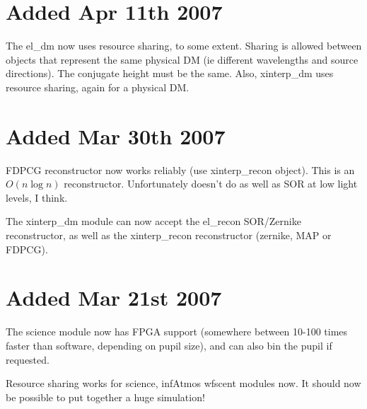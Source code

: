 \documentclass{article}
\begin{document}
\section{Added Apr 11th 2007}
The el\_dm now uses resource sharing, to some extent.  Sharing is
allowed between objects that represent the same physical DM (ie
different wavelengths and source directions).  The conjugate height
must be the same.  Also, xinterp\_dm uses resource sharing, again for
a physical DM.

\section{Added Mar 30th 2007}
FDPCG reconstructor now works reliably (use xinterp\_recon object).
This is an $O(n\log n)$ reconstructor.  Unfortunately doesn't do as
well as SOR at low light levels, I think.

The xinterp\_dm module can now accept the el\_recon SOR/Zernike
reconstructor, as well as the xinterp\_recon reconstructor (zernike,
MAP or FDPCG).

\section{Added Mar 21st 2007}
The science module now has FPGA support (somewhere between 10-100
times faster than software, depending on pupil size), and can also bin
the pupil if requested.

Resource sharing works for science, infAtmos wfscent modules now.  It
should now be possible to put together a huge simulation!
\end{document}
